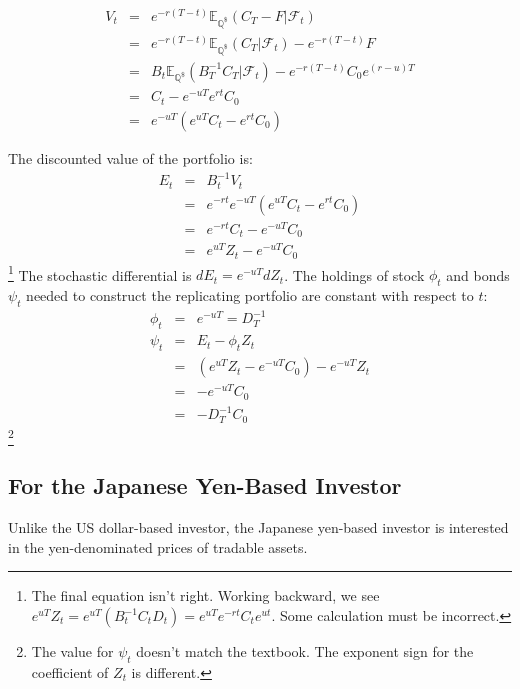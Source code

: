 \documentclass[uplatex,a4j,12pt,dvipdfmx]{jsarticle}
\begin{document}
%
%
\begin{eqnarray*}
	V_{t}
	&=&
	e^{-r(T-t)}
	\mathbb{E}_{\mathbb{Q}^{ \$ }}
	(
	C_{T} - F
	| \mathcal{F}_{t} )
	\\ &=&
	e^{-r(T-t)}
	\mathbb{E}_{\mathbb{Q}^{ \$ }}
	(
	C_{T}
	| \mathcal{F}_{t} )
	- e^{-r(T-t)} F
	\\ &=&
	B_{t}
	\mathbb{E}_{\mathbb{Q}^{ \$ }}
	(B_{T}^{-1} C_{T} | \mathcal{F}_{t} )
	- e^{-r(T-t)} C_{0} e^{(r-u)T}
	\\ &=&
	C_{t} - e^{-uT} e^{rt} C_{0}
	\\ &=&
	e^{-uT}
	\left(
	e^{uT} C_{t}
	- e^{rt} C_{0}
	\right)
\end{eqnarray*}
%
%

The discounted value of the portfolio is:
%
%
\begin{eqnarray*}
	E_{t}
	&=&
	B^{-1}_{t} V_{t}
	\\ &=&
	e^{-rt}
	e^{-uT}
	\left(
	e^{uT} C_{t}
	- e^{rt} C_{0}
	\right)
	\\ &=&
	e^{-rt} C_{t} - e^{-uT} C_{0}
	\\ &=&
	e^{uT} Z_{t} - e^{-uT} C_{0}
\end{eqnarray*}
%
%
\footnote{The final equation isn't right. Working backward, we see $e^{uT}Z_{t}=e^{uT}(B_{t}^{-1} C_{t} D_{t})=e^{uT} e^{-rt} C_{t} e^{ut}$. Some calculation must be incorrect.}
The stochastic differential is $dE_{t} = e^{-uT} dZ_{t}$.
The holdings of stock $\phi_{t}$ and bonds $\psi_{t}$ needed to construct the replicating portfolio are constant with respect to $t$:
%
%
\begin{eqnarray*}
	\phi_{t} &=& e^{-uT} = D_{T}^{-1}
	\\[3mm]
	\psi_{t} &=& E_{t} - \phi_{t} Z_{t}
	\\ &=&
	(e^{uT} Z_{t} - e^{-uT} C_{0}) - e^{-uT} Z_{t}
	\\ &=&
	- e^{-uT} C_{0}
	\\ &=&
	- D_{T}^{-1} C_{0}
\end{eqnarray*}
%
%
\footnote{The value for $\psi_{t}$ doesn't match the textbook. The exponent sign for the coefficient of $Z_{t}$ is different.}

\subsection{For the Japanese Yen-Based Investor}

Unlike the US dollar-based investor, the Japanese yen-based investor is interested in the yen-denominated prices of tradable assets.
\end{document}
